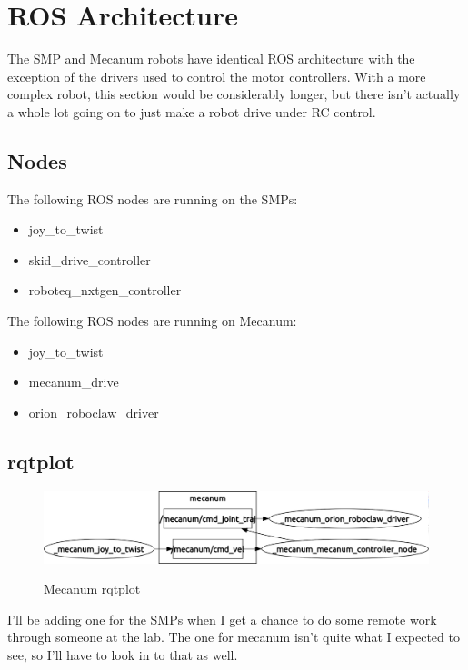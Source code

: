 
\chapter{ROS Architecture}
\label{chap:rosarch}

The SMP and Mecanum robots have identical ROS architecture with the exception of the drivers used to control the motor controllers. With a more complex robot, this section would be considerably longer, but there isn't actually a whole lot going on to just make a robot drive under RC control.

\section{Nodes}

The following ROS nodes are running on the SMPs:

\begin{itemize}
\item{joy\_to\_twist}
\item{skid\_drive\_controller}
\item{roboteq\_nxtgen\_controller}
\end{itemize}

The following ROS nodes are running on Mecanum:

\begin{itemize}
\item{joy\_to\_twist}
\item{mecanum\_drive}
\item{orion\_roboclaw\_driver}
\end{itemize}

\section{rqtplot}

\begin{figure}[h]
\centering
\includegraphics[width=\textwidth]{rqtplotmecanum.png}
\label{fig:rqtplotmecanum}
\caption{Mecanum rqtplot}
\end{figure}

I'll be adding one for the SMPs when I get a chance to do some remote work through someone at the lab. The one for mecanum isn't quite what I expected to see, so I'll have to look in to that as well.


